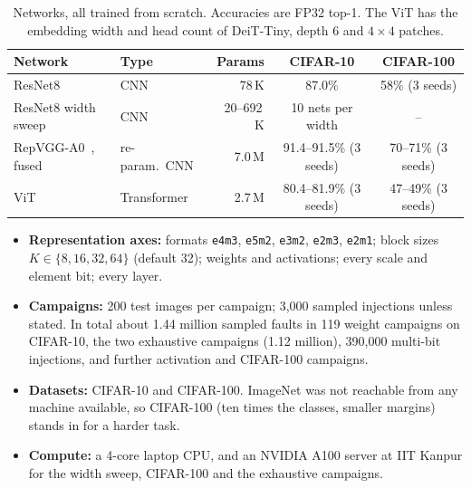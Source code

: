 \documentclass[12pt,a4paper]{article}
\newcommand{\fmt}[1]{\texttt{#1}}
\begin{document}
\begin{table}[H]
\centering
\caption{Networks, all trained from scratch. Accuracies are FP32 top-1. The ViT has the
embedding width and head count of DeiT-Tiny, depth 6 and $4\times4$ patches.}
\label{tab:models}
\footnotesize
\setlength{\tabcolsep}{4pt}
\begin{tabular}{llrcc}
\toprule
\textbf{Network} & \textbf{Type} & \textbf{Params} & \textbf{CIFAR-10} & \textbf{CIFAR-100} \\
\midrule
ResNet8~\cite{he2016resnet,banbury2021mlperftiny} & CNN & 78\,K & 87.0\% & 58\% (3 seeds) \\
ResNet8 width sweep & CNN & 20--692\,K & 10 nets per width & -- \\
RepVGG-A0~\cite{ding2021repvgg}, fused & re-param.\ CNN & 7.0\,M & 91.4--91.5\% (3 seeds) & 70--71\% (3 seeds) \\
ViT~\cite{dosovitskiy2021vit,touvron2021deit} & Transformer & 2.7\,M & 80.4--81.9\% (3 seeds) & 47--49\% (3 seeds) \\
\bottomrule
\end{tabular}
\end{table}

\begin{itemize}
    \item \textbf{Representation axes:} formats \fmt{e4m3}, \fmt{e5m2}, \fmt{e3m2}, \fmt{e2m3},
          \fmt{e2m1}; block sizes $K\in\{8,16,32,64\}$ (default 32); weights and activations;
          every scale and element bit; every layer.
    \item \textbf{Campaigns:} 200 test images per campaign; 3,000 sampled injections unless
          stated. In total about 1.44 million sampled faults in 119 weight campaigns on
          CIFAR-10, the two exhaustive campaigns (1.12 million), 390,000 multi-bit injections,
          and further activation and CIFAR-100 campaigns.
    \item \textbf{Datasets:} CIFAR-10 and CIFAR-100. ImageNet was not reachable from any
          machine available, so CIFAR-100 (ten times the classes, smaller margins) stands in
          for a harder task.
    \item \textbf{Compute:} a 4-core laptop CPU, and an NVIDIA A100 server at IIT Kanpur for the
          width sweep, CIFAR-100 and the exhaustive campaigns.
\end{itemize}
\end{document}
